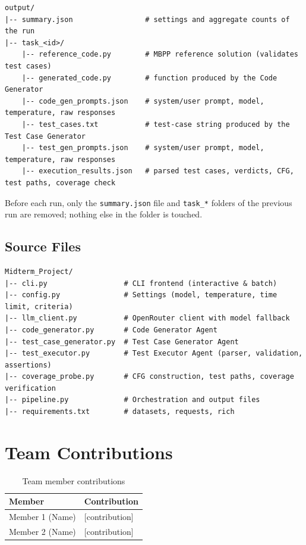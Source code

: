 \documentclass[12pt, a4paper]{article}
\begin{document}
\begin{lstlisting}[style=plain]
output/
|-- summary.json                 # settings and aggregate counts of the run
|-- task_<id>/
    |-- reference_code.py        # MBPP reference solution (validates test cases)
    |-- generated_code.py        # function produced by the Code Generator
    |-- code_gen_prompts.json    # system/user prompt, model, temperature, raw responses
    |-- test_cases.txt           # test-case string produced by the Test Case Generator
    |-- test_gen_prompts.json    # system/user prompt, model, temperature, raw responses
    |-- execution_results.json   # parsed test cases, verdicts, CFG, test paths, coverage check
\end{lstlisting}

Before each run, only the \texttt{summary.json} file and \texttt{task\_*} folders of the previous run are removed; nothing else in the folder is touched.

\subsection{Source Files}

\begin{lstlisting}[style=plain]
Midterm_Project/
|-- cli.py                  # CLI frontend (interactive & batch)
|-- config.py               # Settings (model, temperature, time limit, criteria)
|-- llm_client.py           # OpenRouter client with model fallback
|-- code_generator.py       # Code Generator Agent
|-- test_case_generator.py  # Test Case Generator Agent
|-- test_executor.py        # Test Executor Agent (parser, validation, assertions)
|-- coverage_probe.py       # CFG construction, test paths, coverage verification
|-- pipeline.py             # Orchestration and output files
|-- requirements.txt        # datasets, requests, rich
\end{lstlisting}

\section{Team Contributions}

\begin{table}[H]
    \centering
    \begin{tabular}{lp{10cm}}
        \toprule
        \textbf{Member} & \textbf{Contribution} \\
        \midrule
        Member 1 (Name) & [contribution] \\
        \midrule
        Member 2 (Name) & [contribution] \\
        \bottomrule
    \end{tabular}
    \caption{Team member contributions}
\end{table}
\end{document}
